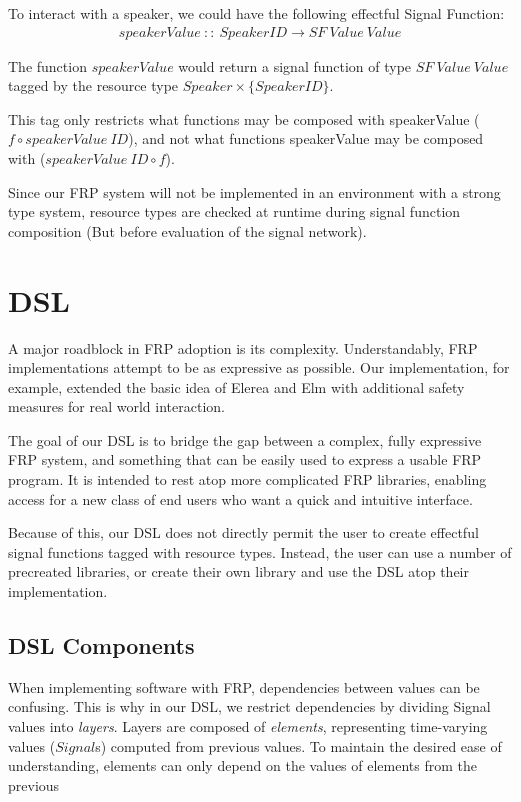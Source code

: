 \documentclass[twocolumn,11pt,english]{article}
\begin{document}
To interact with a speaker, we could have the following effectful Signal Function:
\small
\begin{align*}
  speakerValue~::~SpeakerID \rightarrow SF~Value~Value
\end{align*}
\normalsize

The function $speakerValue$ would return a signal function of type $SF~Value~Value$ tagged by the resource type $Speaker \times \{SpeakerID\}$. 

This tag only restricts what functions may be composed with speakerValue ($f \circ speakerValue~ID$), and not what functions speakerValue may be composed with ($speakerValue~ID \circ f$).

Since our FRP system will not be implemented in an environment with a strong type system, resource types are checked at runtime during signal function composition (But before evaluation of the signal network). 

\section{DSL}

A major roadblock in FRP adoption is its complexity. Understandably, FRP implementations attempt to be as expressive as possible. Our implementation, for example, extended the basic idea of Elerea and Elm with additional safety measures for real world interaction. 

The goal of our DSL is to bridge the gap between a complex, fully expressive FRP system, and something that can be easily used to express a usable FRP program. It is intended to rest atop more complicated FRP libraries, enabling access for a new class of end users who want a quick and intuitive interface.

Because of this, our DSL does not directly permit the user to create effectful signal functions tagged with resource types. Instead, the user can use a number of precreated libraries, or create their own library and use the DSL atop their implementation. 

\subsection{DSL Components}

When implementing software with FRP, dependencies between values can be confusing. This is why in our DSL, we restrict dependencies by dividing Signal values into \textit{layers}. Layers are composed of \textit{elements}, representing time-varying values ($Signal$s) computed from previous values. To maintain the desired ease of understanding, elements can only depend on the values of elements from the previous 
\end{document}
